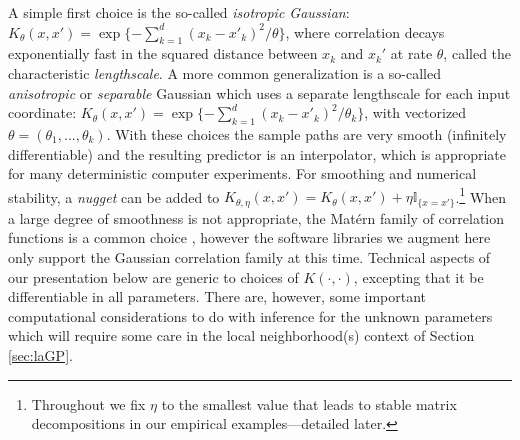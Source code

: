 \documentclass[12pt]{article}
\begin{document}
A simple first choice is the so-called {\em isotropic Gaussian}: 
$K_\theta(x, x') = \exp\{-\sum_{k=1}^d (x_k - x'_k)^2/\theta\}$, where correlation decays
exponentially fast in the squared distance between $x_k$ and $x_k'$ at rate
$\theta$, called the characteristic {\em lengthscale}.  A more common
generalization is a so-called {\em anisotropic} or {\em separable} Gaussian
which uses a separate lengthscale for each input coordinate: $K_\theta(x, x')
= \exp\{-\sum_{k=1}^d (x_k - x'_k)^2/\theta_k\}$, with vectorized
$\theta=(\theta_1,...,\theta_k)$.
With these choices the sample paths are very
smooth (infinitely differentiable) and the resulting predictor is an
interpolator, which is appropriate for many deterministic computer
experiments.  For smoothing and numerical stability, a {\em nugget} can be
added to $K_{\theta, \eta}(x, x') = K_\theta(x, x') + \eta
\mathbb{I}_{\{x=x'\}}$.\footnote{Throughout we fix $\eta$ to the
smallest value that leads to stable matrix decompositions in our empirical
examples---detailed later.} 
When a large degree of smoothness is not appropriate, the Mat\'ern family of
correlation functions is a common choice \citep{stein:1999}, however the
software libraries we augment here only support the Gaussian
correlation family at this time. Technical aspects of
our presentation below are generic to choices of $K(\cdot, \cdot)$, excepting
that it be differentiable in all parameters.  There are, however, some
important computational considerations to do with inference for the unknown
parameters which will require some care in the local neighborhood(s) context
of Section \ref{sec:laGP}.
\end{document}
